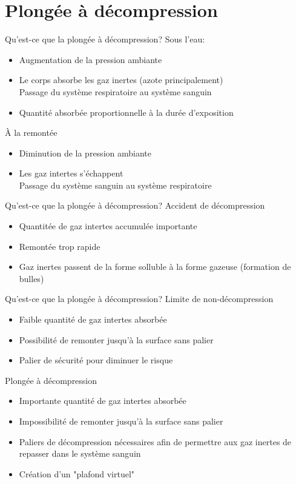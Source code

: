 
\section{Plongée à décompression}

\begin{frame}{Qu'est-ce que la plongée à décompression?}
	Sous l'eau:
	\begin{itemize}
		\item Augmentation de la pression ambiante
		\item Le corps absorbe les gaz inertes (azote principalement)\\
				Passage du système respiratoire au système sanguin
		\item Quantité absorbée proportionnelle à la durée d'exposition
	\end{itemize}
	\vfill
	À la remontée
	\begin{itemize}
		\item Diminution de la pression ambiante
		\item Les gaz intertes s'échappent\\
				Passage du système sanguin au système respiratoire
	\end{itemize}
\end{frame}

\begin{frame}{Qu'est-ce que la plongée à décompression?}  
	Accident de décompression
	\begin{itemize}
		\item Quantitée de gaz intertes accumulée importante
		\item Remontée trop rapide
		\item Gaz inertes passent de la forme solluble à la forme gazeuse (formation de bulles)
	\end{itemize}
\end{frame}

\begin{frame}{Qu'est-ce que la plongée à décompression?}  
	Limite de non-décompression
	\begin{itemize}
		\item Faible quantité de gaz intertes absorbée
		\item Possibilité de remonter jusqu'à la surface sans palier
		\item Palier de sécurité pour diminuer le risque
	\end{itemize}
	\vfill
	Plongée à décompression
	\begin{itemize}
		\item Importante quantité de gaz intertes absorbée
		\item Impossibilité de remonter jusqu'à la surface sans palier
		\item Paliers de décompression nécessaires afin de permettre aux gaz inertes de repasser dans le système sanguin
		\item Création d'un "plafond virtuel"
	\end{itemize}
\end{frame}


